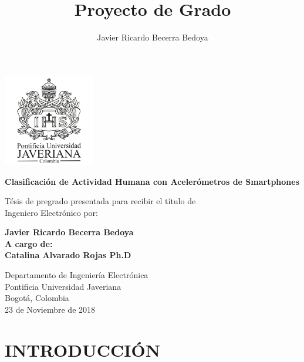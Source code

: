 \documentclass[11pt]{report}
\title{Proyecto de Grado}
\author{Javier Ricardo Becerra Bedoya}
\begin{document}

\begin{titlepage}
   \begin{center}

       \includegraphics[width=0.3\textwidth]{university}
       
\vspace{0.5cm}

 	\Huge

       \textbf{Clasificación de Actividad Humana con Acelerómetros de Smartphones}

       \LARGE

       \vspace{1cm}
       Tésis de pregrado presentada para recibir el título de\\
       Ingeniero Electrónico por:


\vspace{0.5cm}

       \textbf{Javier Ricardo Becerra Bedoya}\\
\vspace{1.5cm}
       \textbf{A cargo de:}\\
       \textbf{Catalina Alvarado Rojas Ph.D}  

       \vspace{0.8cm}
 
	\large
       Departamento de Ingeniería Electrónica\\
       Pontificia Universidad Javeriana\\
       Bogotá, Colombia\\
       23 de Noviembre de 2018
 
   \end{center}
\end{titlepage}


\chapter{INTRODUCCIÓN}
\end{document}
